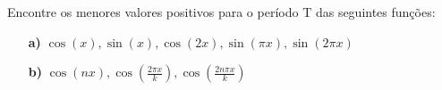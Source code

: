 \linespread{1.5}
Encontre os menores valores positivos para o período T das seguintes funções:
\\
\begin{itemize}
    \item[\textbf{a)}] $\cos{(x)}, \sin{(x)}, \cos{(2x)}, \sin{(\pi x)}, \sin{(2\pi x)}$
    \item[\textbf{b)}]  $\cos{(nx)}, \cos{(\frac{2\pi x}{k})}, \cos{(\frac{2n\pi x}{k})}$
\end{itemize}

